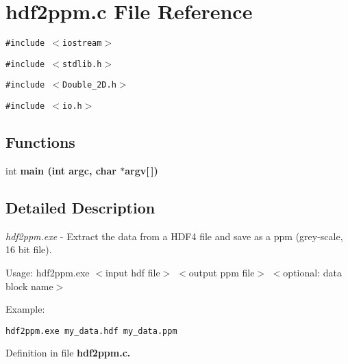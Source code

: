 \section{hdf2ppm.c File Reference}
\label{hdf2ppm_8c}
{\tt \#include $<$iostream$>$}\par
{\tt \#include $<$stdlib.h$>$}\par
{\tt \#include $<$Double\_\-2D.h$>$}\par
{\tt \#include $<$io.h$>$}\par
\subsection*{Functions}
\begin{CompactItemize}
\item 
int \bf{main} (int argc, char $\ast$argv[$\,$])\label{hdf2ppm_8c_28052c36c3b61c6c0eaa18f5d226118f}

\end{CompactItemize}


\subsection{Detailed Description}
{\em hdf2ppm.exe\/} - Extract the data from a HDF4 file and save as a ppm (grey-scale, 16 bit file).

Usage: hdf2ppm.exe $<$input hdf file$>$ $<$output ppm file$>$ $<$optional: data block name$>$\begin{Desc}
\item[]\end{Desc}
\begin{Desc}
\item[Example:]

\footnotesize\begin{verbatim}hdf2ppm.exe my_data.hdf my_data.ppm  \end{verbatim}
\normalsize
 \end{Desc}


Definition in file \bf{hdf2ppm.c}.